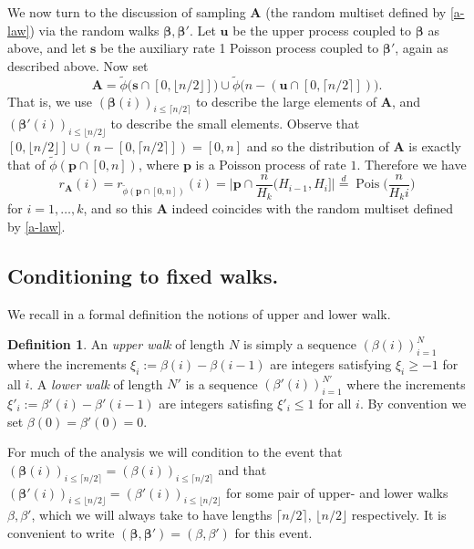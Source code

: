 \documentclass[11pt,reqno]{amsart}
\numberwithin{equation}{section}
\theoremstyle{definition}
\newtheorem{definition}[theorem]{Definition}
\theoremstyle{remark}
\newcommand{\mbf}{\mathbf}
\newcommand\Pois{\operatorname{Pois}}
\def\boldbeta{\boldsymbol\beta}
\renewcommand{\le}{\leqslant}
\renewcommand{\ge}{\geqslant}
\newcommand\samedist{\overset{d}{=}}
\begin{document}
We now turn to the discussion of sampling $\mbf{A}$ (the random multiset defined by \cref{a-law}) via the random walks $\boldbeta,\boldbeta'$.  Let $\mbf{u}$ be the upper process coupled to $\boldbeta$ as above, and let $\mbf{s}$ be the auxiliary rate 1 Poisson process coupled to $\boldbeta'$, again as described above. Now set 
\begin{equation*} \mbf{A} = \tilde\phi\big(\mbf{s} \cap[0, \lfloor n/2\rfloor]\big) \cup \tilde\phi \big(n - (\mbf{u} \cap [0,\lceil n/2\rceil])\big).\end{equation*}
That is, we use $(\boldbeta(i))_{i \le \lceil n/2\rceil}$ to describe the large elements of $\mbf{A}$, and $(\boldbeta'(i))_{i \le \lfloor n/2\rfloor}$ to describe the small elements.
Observe that $[0, \lfloor n/2\rfloor] \cup (n - [0,\lceil n/2\rceil]) = [0,n]$ and so the distribution of $\mbf{A}$ is exactly that of $\tilde\phi(\mbf{p} \cap [0,n])$, where $\mbf{p}$ is a Poisson process of rate $1$. Therefore we have
\[ r_{\mbf{A}}(i) = r_{\tilde\phi(\mbf{p} \cap [0,n])}(i) =  \big| \mbf{p} \cap \frac{n}{H_k}(H_{i-1}, H_i] \big| \samedist \Pois\big(\frac{n}{H_k i}\big)\] for $i = 1,\dots, k$, and so this $\mbf{A}$ indeed coincides with the random multiset defined by \cref{a-law}. 






\subsection{Conditioning to fixed walks.} \label{subsec-53} We recall in a formal definition the notions of upper and lower walk.

\begin{definition}
An \emph{upper walk} of length $N$ is simply a sequence $(\beta(i))_{i = 1}^{N}$ where the increments $\xi_i := \beta(i) - \beta(i-1)$ are integers satisfying $\xi_i \ge -1$ for all $i$. A \emph{lower walk} of length $N'$ is a sequence $(\beta'(i))_{i = 1}^{N'}$ where the increments $\xi'_i := \beta'(i) - \beta'(i-1)$ are integers satisfing $\xi'_i \le 1$ for all $i$. By convention we set $\beta(0) = \beta'(0) = 0$.    
\end{definition}

For much of the analysis we will condition to the event that $(\boldbeta(i))_{i \le \lceil n/2\rceil} = (\beta(i))_{i \le \lceil n/2\rceil}$ and that $(\boldbeta'(i))_{i \le \lfloor n/2\rfloor} = (\beta'(i))_{i \le \lfloor n/2\rfloor}$ for some pair of upper- and lower walks $\beta, \beta'$, which we will always take to have lengths $\lceil n/2\rceil$, $\lfloor n/2\rfloor$ respectively. It is convenient to write $(\boldbeta,\boldbeta') = (\beta,\beta')$ for this event. 
\end{document}
